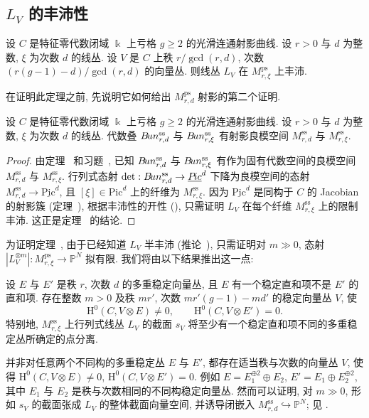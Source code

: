 \subsection{\texorpdfstring{$L_V$ 的丰沛性}{行列式线丛的丰沛性}}\label{src:9.6.3-subsection}
\begin{theorem}\label{src:9.6.8}
设 $C$ 是特征零代数闭域 $\Bbbk$ 上亏格 $g\geq2$ 的光滑连通射影曲线. 设 $r>0$ 与 $d$ 为整数, $\xi$ 为次数 $d$ 的线丛. 设 $V$ 是 $C$ 上秩 $r/\gcd(r,d)$, 次数 $(r(g-1)-d)/\gcd(r,d)$ 的向量丛. 则线丛 $L_V$ 在 $M_{r,\xi}^{\mathrm{ps}}$ 上丰沛.
\end{theorem}
在证明此定理之前, 先说明它如何给出 $M_{r,d}^{\mathrm{ps}}$ 射影的第二个证明.
\begin{corollary}\label{src:9.6.9}
设 $C$ 是特征零代数闭域 $\Bbbk$ 上亏格 $g\geq2$ 的光滑连通射影曲线. 设 $r>0$ 与 $d$ 为整数, $\xi$ 为次数 $d$ 的线丛. 代数叠 $B\!un_{r,d}^{\mathrm{ss}}$ 与 $B\!un_{r,\xi}^{\mathrm{ss}}$ 有射影良模空间 $M_{r,d}^{\mathrm{ss}}$ 与 $M_{r,\xi}^{\mathrm{ss}}$.
\end{corollary}
\begin{proof}
由定理~ 和习题~, 已知 $B\!un_{r,d}^{\mathrm{ss}}$ 与 $B\!un_{r,\xi}^{\mathrm{ss}}$ 有作为固有代数空间的良模空间 $M_{r,d}^{\mathrm{ss}}$ 与 $M_{r,\xi}^{\mathrm{ss}}$. 行列式态射 $\det:B\!un_{r,d}^{\mathrm{ss}}\to\underline{P\!ic}^d$ 下降为良模空间的态射 $M_{r,d}^{\mathrm{ss}}\to\underline{\mathrm{Pic}}^d$, 且 $[\xi]\in\mathrm{Pic}^d$ 上的纤维为 $M_{r,\xi}^{\mathrm{ss}}$. 因为 $\underline{\mathrm{Pic}}^d$ 是同构于 $C$ 的 Jacobian 的射影簇 (定理~), 根据丰沛性的开性 (), 只需证明 $L_V$ 在每个纤维 $M_{r,\xi}^{\mathrm{ss}}$ 上的限制丰沛. 这正是定理~ 的结论.
\end{proof}
为证明定理~, 由于已经知道 $L_V$ 半丰沛 (推论~), 只需证明对 $m\gg0$, 态射 $|L_V^{\otimes m}|:M_{r,\xi}^{\mathrm{ps}}\to\mathbb P^N$ 拟有限. 我们将由以下结果推出这一点:
\begin{proposition}\label{src:9.6.10}
设 $E$ 与 $E'$ 是秩 $r$, 次数 $d$ 的多重稳定向量丛, 且 $E$ 有一个稳定直和项不是 $E'$ 的直和项. 存在整数 $m>0$ 及秩 $mr'$, 次数 $mr'(g-1)-md'$ 的稳定向量丛 $V$, 使
\[
\mathrm H^0(C,V\otimes E)\neq0,\qquad\mathrm H^0(C,V\otimes E')=0.
\]
特别地, $M_{r,\xi}^{\mathrm{ss}}$ 上行列式线丛 $L_V$ 的截面 $s_V$ 将至少有一个稳定直和项不同的多重稳定丛所确定的点分离.
\end{proposition}
\begin{remark}\label{src:9.6.11}
并非对任意两个不同构的多重稳定丛 $E$ 与 $E'$, 都存在适当秩与次数的向量丛 $V$, 使得 $\mathrm H^0(C,V\otimes E)\neq0$, $\mathrm H^0(C,V\otimes E')=0$. 例如 $E=E_1^{\oplus2}\oplus E_2$, $E'=E_1\oplus E_2^{\oplus2}$, 其中 $E_1$ 与 $E_2$ 是秩与次数相同的不同构稳定向量丛. 然而可以证明, 对 $m\gg0$, 形如 $s_V$ 的截面张成 $L_V$ 的整体截面向量空间, 并诱导闭嵌入 $M_{r,d}^{\mathrm{ss}}\hookrightarrow\mathbb P^N$; 见 \cite[推论 7.15]{CK07}.
\end{remark}
